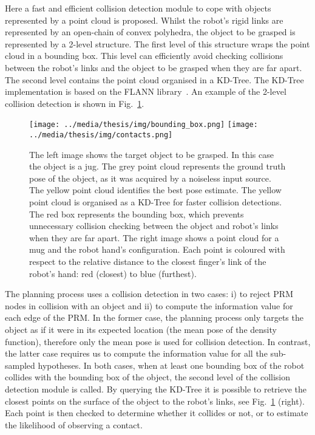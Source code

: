 Here a fast and efficient collision detection module to cope with objects represented by a point cloud is proposed. Whilst the robot's rigid links are represented by an open-chain of convex polyhedra, the object to be grasped is represented by a 2-level structure. The first level of this structure wraps the point cloud in a bounding box. This level can efficiently avoid checking collisions between the robot's links and the object to be grasped when they are far apart. The second level contains the point cloud organised in a KD-Tree. The KD-Tree implementation is based on the FLANN library~\citep{bib:muja_2014}. An example of the 2-level collision detection is shown in Fig.~\ref{fig:bounding_box}.

\begin{figure}[!t]
\centerline{
\texttt{[image: ../media/thesis/img/bounding\_box.png]}
\texttt{[image: ../media/thesis/img/contacts.png]}
}
\caption[Hierarchical collision detection]{The left image shows the target object to be grasped. In this case the object is a jug. The grey point cloud represents the ground truth pose of the object, as it was acquired by a noiseless input source. The yellow point cloud identifies the best pose estimate. The yellow point cloud is organised as a KD-Tree for faster collision detections. The red box represents the bounding box, which prevents unnecessary collision checking between the object and robot's links when they are far apart. The right image shows a point cloud for a mug and the robot hand's configuration. Each point is coloured with respect to the relative distance to the closest finger's link of the robot's hand: red (closest) to blue (furthest). }
\label{fig:bounding_box}
\end{figure}

The planning process uses a collision detection in two cases: i) to reject PRM nodes in collision with an object and ii) to compute the information value for each edge of the PRM. In the former case, the planning process only targets the object as if it were in its expected location (the mean pose of the density function), therefore only the mean pose is used for collision detection. In contrast, the latter case requires us to compute the information value for all the sub-sampled hypotheses. In both cases, when at least one bounding box of the robot collides with the bounding box of the object, the second level of the collision detection module is called. By querying the KD-Tree it is possible to retrieve the closest points on the surface of the object to the robot's links, see Fig.~\ref{fig:bounding_box} (right). Each point is then checked to determine whether it collides or not, or to estimate the likelihood of observing a contact.  

